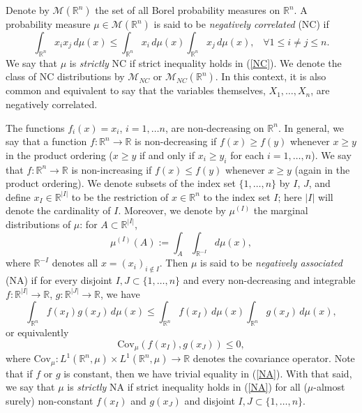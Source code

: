 \documentclass[11pt]{article}
\newcommand{\R}{\mathbb{R}}
\newcommand{\m}{\mathcal{M}}
\newcommand{\C}{\text{Cov}}
\begin{document}
Denote by $\m(\R^n)$ the set of all Borel probability measures on $\R^n$. 
A probability measure $\mu\in \m(\R^n)$ is said to be {\it negatively correlated} (NC) if \begin{equation}\label{NC}
\int_{\R^n} x_ix_j \, d\mu(x) \leq \int_{\R^n} x_i \, d\mu(x) \int_{\R^n}x_j \,d\mu(x), \;\;\; \forall 1\leq i\neq j\leq n.
\end{equation}
We say that $\mu$ is {\it strictly} NC if strict inequality holds in (\ref{NC}).
We denote the class of NC distributions by $\m_{NC}$ or $\m_{NC}(\R^n)$. In this context, it is also common and equivalent to say that the variables themselves, $X_1,\dots, X_n$, are negatively correlated.

The functions $f_i(x)=x_i$, $i=1,\dots n$, are non-decreasing on $\R^n$. In general,
we say that a function $f:\R^n\to \R$ is non-decreasing
if $f(x) \geq f(y)$ whenever $x\geq y$ in the product ordering ($x\geq y$ if and only if $x_i\geq y_i$ for each $i=1,\dots, n$). We say that $f:\R^n\to \R$
is non-increasing if $f(x) \leq f(y)$ whenever $x\geq y$ (again in the product ordering). We
denote subsets of the index set $\{1,\dots, n\}$ by $I$, $J$, 
and define $x_I\in \R^{|I|}$ to be the restriction of $x\in \R^n$ to the index 
set $I$; here $|I|$  will denote the cardinality of $I$. Moreover, we denote by $\mu^{(I)}$ the marginal distributions
of $\mu$: for $A\subset \R^{|I|}$,
\begin{equation}\label{marginal}
\mu^{(I)}(A) := \int_A\int_{\R^{-I}} d\mu(x),
\end{equation}
where $\R^{-I}$ denotes all $x = (x_i)_{i\notin I}$.
Then $\mu$ is said to be {\it negatively associated} (NA) if for every 
disjoint $I,J \subset \{1,\dots, n\}$ and every non-decreasing and integrable
$f:\R^{|I|}\to \R$, $g: \R^{|J|}\to \R$, we have
\begin{equation}\label{NA}
\int_{\R^n} f(x_I)g(x_J) \, d\mu(x) \leq \int_{\R^n}f(x_I)\, d\mu(x) \int_{\R^n} 
g(x_J) \, d\mu(x),
\end{equation}
or equivalently
\begin{equation}\label{NA2}
\C_{\mu}(f(x_I),g(x_J)) \leq 0,
\end{equation}
where $\C_{\mu} :L^1(\R^n,\mu) \times L^1(\R^n,\mu) \to \R$ denotes
the covariance operator. Note that if $f$ or $g$ is constant, then we have trivial equality in (\ref{NA}). With that said, 
we say that $\mu$ is {\it strictly} NA if strict
inequality holds in (\ref{NA}) for all ($\mu$-almost surely) non-constant $f(x_I)$ and $g(x_J)$ and disjoint $I,J\subset\{1,\dots,n\}$. %
\end{document}
